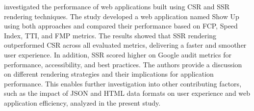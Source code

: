 \citet{clientServerSide:2020} investigated the performance of web applications built using CSR and SSR rendering techniques. The study developed a web application named Show Up using both approaches and compared their performance based on FCP, Speed Index, TTI, and FMP metrics. The results showed that SSR rendering outperformed CSR across all evaluated metrics, delivering a faster and smoother user experience. In addition, SSR scored higher on Google audit metrics for performance, accessibility, and best practices. The authors provide a discussion on different rendering strategies and their implications for application performance. This enables further investigation into other contributing factors, such as the impact of JSON and HTML data formats on user experience and web application efficiency, analyzed in the present study.
